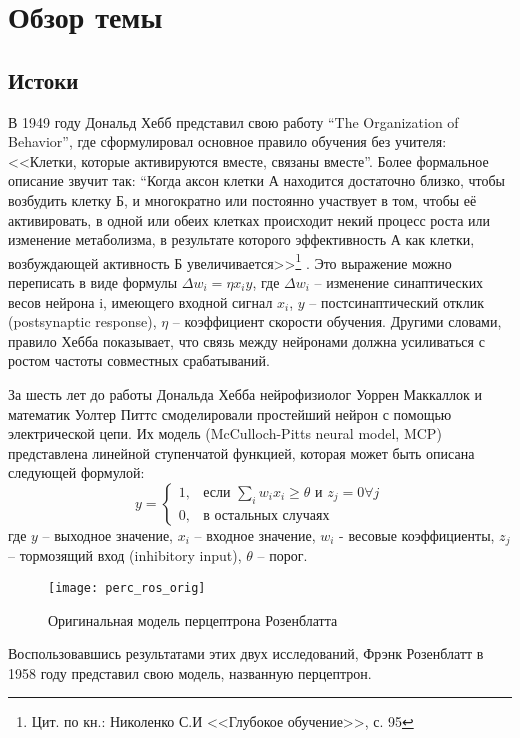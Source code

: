 \clearpage
\section{Обзор темы}
\subsection{Истоки}
В 1949 году Дональд Хебб представил свою работу “The Organization of Behavior”\cite{hebb}, где сформулировал основное правило обучения без учителя: <<Клетки, которые активируются вместе, связаны вместе”. Более формальное описание звучит так: “Когда аксон клетки А находится достаточно близко, чтобы возбудить клетку Б, и многократно или постоянно участвует в том, чтобы её активировать, в одной или обеих клетках происходит некий процесс роста или изменение метаболизма, в результате которого эффективность А как клетки, возбуждающей активность Б увеличивается>>\footnote{Цит. по кн.: Николенко С.И <<Глубокое обучение>>, с. 95} . Это выражение можно переписать в виде формулы $\Delta w_i = \eta x_{i} y$, где $\Delta w_i$ – изменение синаптических весов нейрона i, имеющего входной сигнал $x_i$, $y$ – постсинаптический отклик (postsynaptic response),  $\eta$ -- коэффициент скорости обучения. Другими словами, правило Хебба показывает, что связь между нейронами должна усиливаться с ростом частоты совместных срабатываний. 
\par
За шесть лет до работы Дональда Хебба нейрофизиолог Уоррен Маккаллок и математик Уолтер Питтс смоделировали простейший нейрон с помощью электрической цепи. Их модель (McCulloch-Pitts neural model, MCP) представлена линейной ступенчатой функцией, которая может быть описана следующей формулой:
\begin{equation}
	y =
	\begin{cases}
		1,& \text{если } \sum_{i}{w_i x_i} \geq \theta \text{ и } z_j = 0 \forall{j} \\
		0,& \text{в остальных случаях}
	\end{cases}
\end{equation}
где $y$ – выходное значение, $x_i$ – входное значение, $w_i$ - весовые коэффициенты, $z_j$ – тормозящий вход (inhibitory input), $\theta$ -- порог.
\par
\begin{figure}[h]
	\centering
	\texttt{[image: perc\_ros\_orig]}
	\caption{Оригинальная модель перцептрона Розенблатта}
	\label{hist:rosorig}
\end{figure}
Воспользовавшись результатами этих двух исследований, Фрэнк Розенблатт в 1958 году представил свою модель, названную перцептрон\cite{perceptron}.
